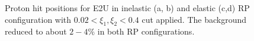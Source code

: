 \begin{figure}[H]
{		\begin{subfigure}[b]{\linewidth}{
				}
		\end{subfigure}
	}
	\quad
	\parbox{0.48\textwidth}{
		\centering
		\begin{subfigure}[b]{\linewidth}{
				}
		\end{subfigure}
	}
	\caption[x]{Proton hit positions for E2U in inelastic (a, b) and elastic (c,d) RP configuration with $0.02<\xi_1,\xi_2<0.4$ cut applied. The background reduced to about $2-4\%$ in both RP configurations.}
\end{figure}
